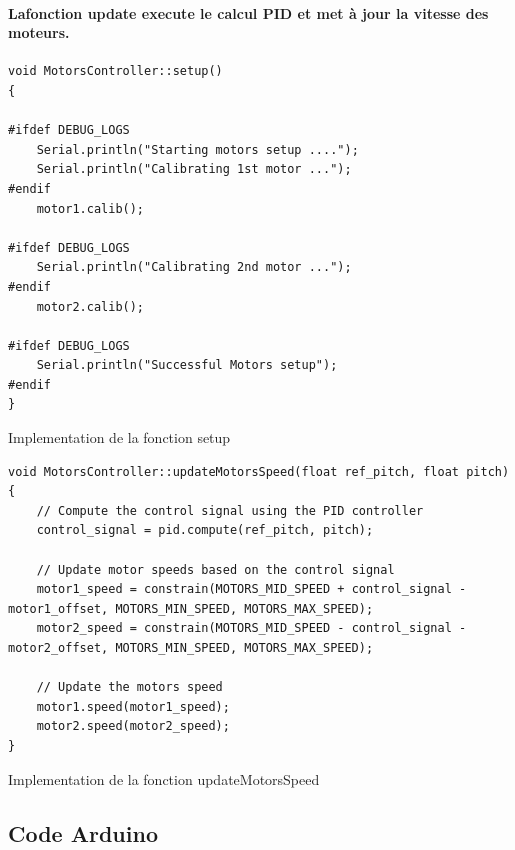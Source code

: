 \paragraph{Lafonction update execute le calcul PID et met à jour la vitesse des moteurs.}

\newpage

\begin{listing}[!htpb]
	\begin{verbatim}
void MotorsController::setup()
{

#ifdef DEBUG_LOGS
	Serial.println("Starting motors setup ....");
	Serial.println("Calibrating 1st motor ...");
#endif
	motor1.calib();

#ifdef DEBUG_LOGS
	Serial.println("Calibrating 2nd motor ...");
#endif
	motor2.calib();

#ifdef DEBUG_LOGS
	Serial.println("Successful Motors setup");
#endif
}
	\end{verbatim}
	\caption{Implementation de la fonction setup}
	\label{listing:motor-setup}
\end{listing}

\begin{listing}[!htpb]
	\begin{verbatim}
void MotorsController::updateMotorsSpeed(float ref_pitch, float pitch)
{
	// Compute the control signal using the PID controller
	control_signal = pid.compute(ref_pitch, pitch);

	// Update motor speeds based on the control signal
	motor1_speed = constrain(MOTORS_MID_SPEED + control_signal - motor1_offset, MOTORS_MIN_SPEED, MOTORS_MAX_SPEED);
	motor2_speed = constrain(MOTORS_MID_SPEED - control_signal - motor2_offset, MOTORS_MIN_SPEED, MOTORS_MAX_SPEED);

	// Update the motors speed
	motor1.speed(motor1_speed);
	motor2.speed(motor2_speed);
}
	\end{verbatim}
	\caption{Implementation de la fonction updateMotorsSpeed}
	\label{listing:update-motors-speed}
\end{listing}

\newpage

\subsection{Code Arduino}

